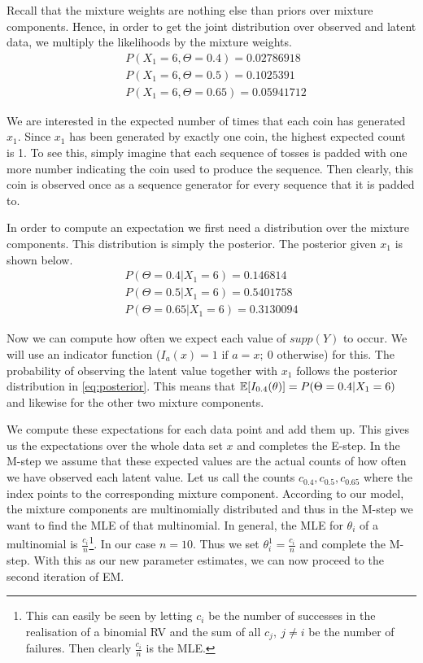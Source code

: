 Recall that the mixture weights are nothing else than priors over mixture components. Hence, in order to get the joint distribution over observed and
latent data, we multiply the likelihoods by the mixture weights.
\begin{align}
&P(X_{1}=6,\Theta=0.4) = 0.02786918 \\
&P(X_{1}=6,\Theta=0.5) = 0.1025391 \nonumber \\ 
&P(X_{1}=6,\Theta=0.65) = 0.05941712 \nonumber
\end{align}

We are interested in the expected number of times that each coin has generated $ x_{1} $. Since $ x_{1} $ has been generated by exactly one coin,
the highest expected count is 1. To see this, simply imagine that each sequence of tosses is padded with one more number indicating the coin
used to produce the sequence. Then clearly, this coin is observed once as a sequence generator for every sequence that it is padded to.

In order to compute an expectation we first need a distribution over the mixture components. This distribution is simply the posterior. The
posterior given $ x_{1} $ is shown below.
\begin{align}\label{eq:posterior}
P(\Theta=0.4|X_{1}=6) = 0.146814 \\
P(\Theta=0.5|X_{1}=6) = 0.5401758 \nonumber \\
P(\Theta=0.65|X_{1}=6) = 0.3130094 \nonumber
\end{align}

Now we can compute how often we expect each value of $ supp(Y) $ to occur. We will use an indicator function ($ I_{a}(x) = 1 \mbox{ if } a=x;~0 $ otherwise) 
for this. The probability of observing the latent value together with $ x_{1} $ follows the posterior distribution in \eqref{eq:posterior}. 
This means that $ \mathbb{E}[I_{0.4}(\theta)] = P(\Theta=0.4|X_{1}=6) $ and likewise for the
other two mixture components.

We compute these expectations for each data point and add them up. This gives us the expectations over the whole data set $ x $ and completes the E-step.
In the M-step we assume that these expected values are the actual counts of how often we have observed each latent value. Let us call the counts 
$ c_{0.4}, c_{0.5}, c_{0.65} $ where the index points to the corresponding mixture component. According to our model, the mixture components are multinomially
distributed and thus in the M-step we want to find the MLE of that multinomial. In general, the MLE for $ \theta_{i} $ of a multinomial is
$ \frac{c_{i}}{n} $\footnote{This can easily be seen by letting $ c_{i} $ be the number of successes in the realisation of a binomial RV and the sum of all
$ c_{j},~j \not = i $ be the number of failures. Then clearly $ \frac{c_{i}}{n} $ is the MLE.}. In our case $ n=10 $. Thus we set 
$ \theta_{i}^{1} = \frac{c_{i}}{n} $ and complete the M-step. With this as our new parameter estimates, we can now proceed to the second iteration of EM.

